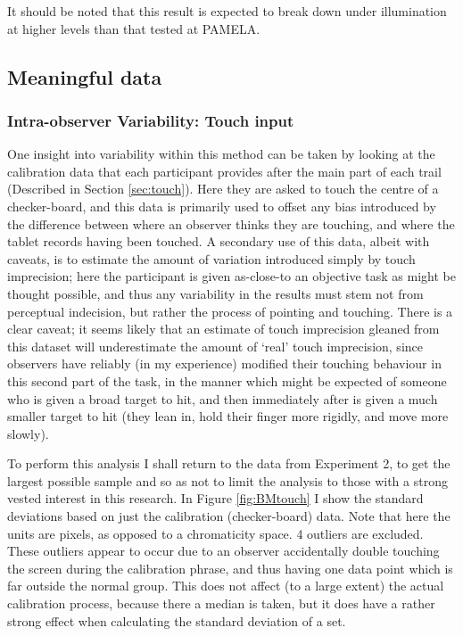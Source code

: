 It should be noted that this result is expected to break down under illumination at higher levels than that tested at \gls{PAMELA}.

\subsection{Meaningful data}

\subsubsection{Intra-observer Variability: Touch input}

One insight into variability within this method can be taken by looking at the calibration data that each participant provides after the main part of each trail (Described in Section \ref{sec:touch}). Here they are asked to touch the centre of a checker-board, and this data is primarily used to offset any bias introduced by the difference between where an observer thinks they are touching, and where the tablet records having been touched. A secondary use of this data, albeit with caveats, is to estimate the amount of variation introduced simply by touch imprecision; here the participant is given as-close-to an objective task as might be thought possible, and thus any variability in the results must stem not from perceptual indecision, but rather the process of pointing and touching. There is a clear caveat; it seems likely that an estimate of touch imprecision gleaned from this dataset will underestimate the amount of `real' touch imprecision, since observers have reliably (in my experience) modified their touching behaviour in this second part of the task, in the manner which might be expected of someone who is given a broad target to hit, and then immediately after is given a much smaller target to hit (they lean in, hold their finger more rigidly, and move more slowly).

To perform this analysis I shall return to the data from Experiment 2, to get the largest possible sample and so as not to limit the analysis to those with a strong vested interest in this research. In Figure \ref{fig:BMtouch} I show the standard deviations based on just the calibration (checker-board) data. Note that here the units are pixels, as opposed to a chromaticity space. 4 outliers are excluded. These outliers appear to occur due to an observer accidentally double touching the screen during the calibration phrase, and thus having one data point which is far outside the normal group. This does not affect (to a large extent) the actual calibration process, because there a median is taken, but it does have a rather strong effect when calculating the standard deviation of a set.

